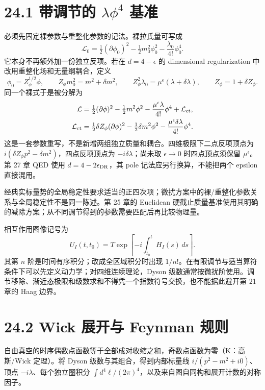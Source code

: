 \documentclass[
  11pt,
  oneside]{book}
\begin{document}
\section{\texorpdfstring{24.1 带调节的 \(\lambda\phi^4\)
基准}{24.1 带调节的 \textbackslash lambda\textbackslash phi\^{}4 基准}}

必须先固定裸参数与重整化参数的记法。裸拉氏量可写成 \[
\mathcal L_0=\tfrac12(\partial\phi_0)^2
-\tfrac12m_0^2\phi_0^2-\frac{\lambda_0}{4!}\phi_0^4.
\] 它本身不再额外加一份独立反项。若在 \(d=4-\epsilon\) 的 dimensional
regularization 中改用重整化场和无量纲耦合，定义 \[
\phi_0=Z_\phi^{1/2}\phi,\qquad
Z_\phi m_0^2=m^2+\delta m^2,\qquad
Z_\phi^2\lambda_0=\mu^\epsilon(\lambda+\delta\lambda),
\qquad Z_\phi=1+\delta Z_\phi.
\] 同一个裸式于是被分解为 \[
\begin{aligned}
\mathcal L={}&\tfrac12(\partial\phi)^2-\tfrac12m^2\phi^2
-\frac{\mu^\epsilon\lambda}{4!}\phi^4+\mathcal L_{\rm ct},\\
\mathcal L_{\rm ct}={}&\tfrac12\delta Z_\phi(\partial\phi)^2
-\tfrac12\delta m^2\phi^2-\frac{\mu^\epsilon\delta\lambda}{4!}\phi^4.
\end{aligned}
\]
这是一套参数重写，不是新增两组独立质量和耦合。四维极限下二点反项顶点为
\(i(\delta Z_\phi p^2-\delta m^2)\)，四点反项顶点为
\(-i\delta\lambda\)；尚未取 \(\epsilon\to0\) 时四点顶点须保留
\(\mu^\epsilon\)。第 27 章 QED 使用 \(d=4-2\epsilon_{\rm DR}\)，其 pole
记法应另行换算，不能把两个 epsilon 直接混用。

经典实标量势的全局稳定性要求适当的正四次项；微扰方案中的裸/重整化参数关系与全局稳定性不是同一陈述。第
25 章的 Euclidean
硬截止质量基准使用其明确的减除方案；从不同调节得到的参数需要匹配后再比较物理量。

相互作用图像记号为 \[
U_I(t,t_0)=T\exp\left[-i\int_{t_0}^{t}H_I(s)\,ds\right].
\] 其第 \(n\) 阶是时间有序积分；改成全区域积分时出现
\(1/n!\)。在有限调节与适当算符条件下可以先定义动力学；对四维连续理论，Dyson
级数通常按微扰阶使用。调节移除、渐近态极限和级数求和不得凭一个指数符号交换，也不能据此避开第
21 章的 Haag 边界。

\section{24.2 Wick 展开与 Feynman 规则}

自由真空的时序偶数点函数等于全部成对收缩之和，奇数点函数为零（K：高斯/Wick
定理）。将 Dyson 级数与其组合，得到内部标量线 \(i/(p^2-m^2+i0)\)、顶点
\(-i\lambda\)、每个独立圈积分
\(\int d^4\ell/(2\pi)^4\)，以及来自图自同构和展开计数的对称因子。
\end{document}
